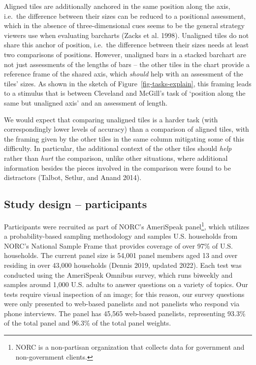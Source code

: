 \documentclass[
]{jds}
\begin{document}
Aligned tiles are additionally anchored in the same position along the
axis, i.e.~the difference between their sizes can be reduced to a
positional assessment, which in the absence of three-dimensional cues
seems to be the general strategy viewers use when evaluating barcharts
(Zacks et al. 1998). Unaligned tiles do not share this anchor of
position, i.e.~the difference between their sizes needs at least two
comparisons of positions. However, unaligned bars in a stacked barchart
are not just assessments of the lengths of bars -- the other tiles in
the chart provide a reference frame of the shared axis, which
\emph{should} help with an assessment of the tiles' sizes. As shown in
the sketch of Figure~\ref{fig-tasks-explain}, this framing leads to a
stimulus that is between Cleveland and McGill's task of `position along
the same but unaligned axis' and an assessment of length.

We would expect that comparing unaligned tiles is a harder task (with
correspondingly lower levels of accuracy) than a comparison of aligned
tiles, with the framing given by the other tiles in the same column
mitigating some of this difficulty. In particular, the additional
context of the other tiles should \emph{help} rather than \emph{hurt}
the comparison, unlike other situations, where additional information
besides the pieces involved in the comparison were found to be
distractors (Talbot, Setlur, and Anand 2014).

\hypertarget{study-design-participants}{%
\subsection{Study design --
participants}\label{study-design-participants}}

Participants were recruited as part of NORC's AmeriSpeak
panel\footnote{NORC is a non-partisan organization that collects data
  for government and non-government clients.}, which utilizes a
probability-based sampling methodology and samples U.S. households from
NORC's National Sample Frame that provides coverage of over 97\% of U.S.
households. The current panel size is 54,001 panel members aged 13 and
over residing in over 43,000 households (Dennis 2019, updated 2022).
Each test was conducted using the AmeriSpeak Omnibus survey, which runs
biweekly and samples around 1,000 U.S. adults to answer questions on a
variety of topics. Our tests require visual inspection of an image; for
this reason, our survey questions were only presented to web-based
panelists and not panelists who respond via phone interviews. The panel
has 45,565 web-based panelists, representing 93.3\% of the total panel
and 96.3\% of the total panel weights.
\end{document}
